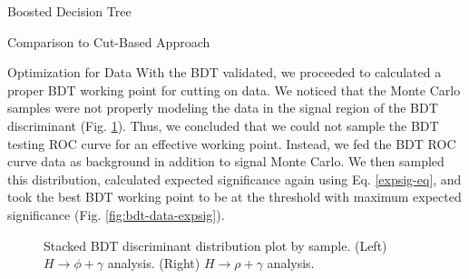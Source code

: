 \begin{section}{Boosted Decision Tree}
\begin{subsection}{Comparison to Cut-Based Approach}
\end{subsection}
\begin{subsection}{Optimization for Data}\label{optim-for-data}
With the BDT validated, we proceeded to calculated a proper BDT working point for cutting on data. We noticed that the Monte Carlo samples were not properly modeling the data in the signal region of the BDT discriminant (Fig. \ref{fig:bdt-thresh-dist}). Thus, we concluded that we could not sample the BDT testing ROC curve for an effective working point. Instead, we fed the BDT ROC curve data as background in addition to signal Monte Carlo. We then sampled this distribution, calculated expected significance again using Eq. \ref{expsig-eq}, and took the best BDT working point to be at the threshold with maximum expected significance (Fig. \ref{fig:bdt-data-expsig}).

\begin{figure}[htb]
\begin{center}
\quad
{}
\end{center}
\caption{Stacked BDT discriminant distribution plot by sample. (Left) $H\rightarrow\phi+\gamma$ analysis. (Right) $H\rightarrow\rho+\gamma$ analysis.}
\label{fig:bdt-thresh-dist}
\end{figure}

\end{subsection}
\end{section}

